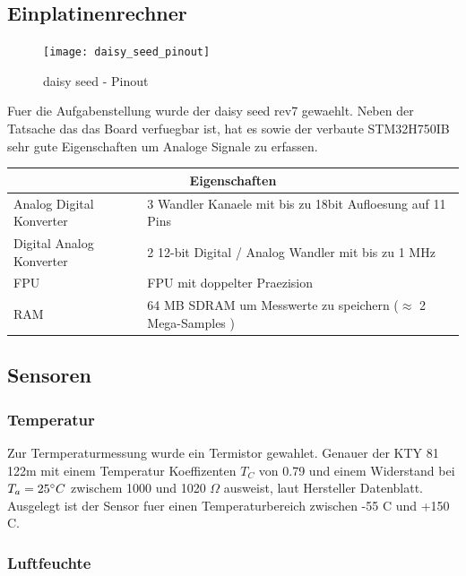 \documentclass{report}
\begin{document}
\subsection{Einplatinenrechner}
\begin{figure} [h!]
\texttt{[image: daisy\_seed\_pinout]}
\caption{daisy seed - Pinout}
\label{fig:daisy-ssed-pinout}
\end{figure}
\begin{center}

Fuer die Aufgabenstellung wurde der daisy seed rev7 gewaehlt. Neben der Tatsache das das Board verfuegbar ist, hat es sowie der verbaute STM32H750IB sehr gute Eigenschaften \cite{stm32h750} um Analoge Signale zu erfassen.

\begin{tabular} {| p{12em} | p{20em} |}
\hline
\multicolumn{2}{|c|}{Eigenschaften} \\
\hline
Analog Digital Konverter & 3 Wandler Kanaele mit bis zu 18bit Aufloesung auf 11 Pins \\
\hline
Digital Analog Konverter & 2 12-bit Digital / Analog Wandler mit bis zu 1 MHz \\
\hline
FPU & FPU mit doppelter Praezision \\
\hline
RAM & 64 MB SDRAM um Messwerte zu speichern ($\approx$ 2 Mega-Samples )\\
\hline
\end{tabular}
\end{center}

\subsection{Sensoren}
\subsubsection{Temperatur}
Zur Termperaturmessung wurde ein Termistor gewahlet. Genauer der KTY 81 122m mit einem Temperatur Koeffizenten $T_C$ von 0.79 und einem Widerstand bei $T_a = 25 \degree C$ zwischem 1000 und 1020 $\Omega$ ausweist, laut Hersteller Datenblatt. Ausgelegt ist der Sensor fuer einen Temperaturbereich zwischen -55 \degree C und +150 \degree C.
\subsubsection{Luftfeuchte}
\end{document}
